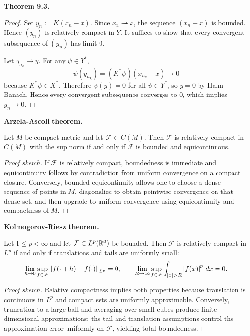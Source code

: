 \documentclass[11pt]{article}
\newenvironment{theoremstmt}[1]{%
  \par\medskip\noindent\textbf{Theorem #1. }\itshape
}{\par\medskip}
\newenvironment{namedstmt}[1]{%
  \par\medskip\noindent\textbf{#1. }\itshape
}{\par\medskip}
\begin{document}
\begin{theoremstmt}{9.3}
\thmCompactWeakToStrong
\end{theoremstmt}

\begin{proof}
Set $y_n:=K(x_n-x)$. Since $x_n\rightharpoonup x$, the sequence $(x_n-x)$ is bounded. Hence $(y_n)$ is relatively compact in $Y$. It suffices to show that every convergent subsequence of $(y_n)$ has limit $0$.

Let $y_{n_k}\to y$. For any $\psi\in Y^*$,
\[
\psi(y_{n_k})=(K^*\psi)(x_{n_k}-x)\to 0
\]
because $K^*\psi\in X^*$. Therefore $\psi(y)=0$ for all $\psi\in Y^*$, so $y=0$ by Hahn-Banach. Hence every convergent subsequence converges to $0$, which implies $y_n\to 0$.
\end{proof}

\begin{namedstmt}{Arzela-Ascoli theorem}
Let $M$ be compact metric and let $\mathcal F\subset C(M)$. Then $\mathcal F$ is relatively compact in $C(M)$ with the sup norm if and only if $\mathcal F$ is bounded and equicontinuous.
\end{namedstmt}

\begin{proof}[Proof sketch]
If $\mathcal F$ is relatively compact, boundedness is immediate and equicontinuity follows by contradiction from uniform convergence on a compact closure. Conversely, bounded equicontinuity allows one to choose a dense sequence of points in $M$, diagonalize to obtain pointwise convergence on that dense set, and then upgrade to uniform convergence using equicontinuity and compactness of $M$.
\end{proof}

\begin{namedstmt}{Kolmogorov-Riesz theorem}
Let $1\le p<\infty$ and let $\mathcal F\subset L^p(\mathbb{R}^d)$ be bounded. Then $\mathcal F$ is relatively compact in $L^p$ if and only if translations and tails are uniformly small:
\[
\lim_{h\to 0}\sup_{f\in\mathcal F}\left\lVert f(\cdot+h)-f(\cdot)\right\rVert_{L^p}=0,
\qquad
\lim_{R\to\infty}\sup_{f\in\mathcal F}\int_{\left\lvert x\right\rvert>R}\left\lvert f(x)\right\rvert^p\,dx=0.
\]
\end{namedstmt}

\begin{proof}[Proof sketch]
Relative compactness implies both properties because translation is continuous in $L^p$ and compact sets are uniformly approximable. Conversely, truncation to a large ball and averaging over small cubes produce finite-dimensional approximations; the tail and translation assumptions control the approximation error uniformly on $\mathcal F$, yielding total boundedness.
\end{proof}
\end{document}

